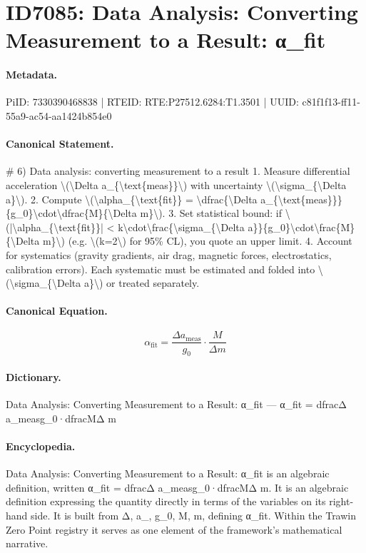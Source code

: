 \section*{ID7085: Data Analysis: Converting Measurement to a Result: α\_fit}
\paragraph{Metadata.}
PiID: 7330390468838 | RTEID: RTE:P27512.6284:T1.3501 | UUID: c81f1f13-ff11-55a9-ac54-aa1424b854e0

\paragraph{Canonical Statement.}
\# 6) Data analysis: converting measurement to a result 1. Measure differential acceleration \textbackslash{}(\textbackslash{}Delta a\_\{\textbackslash{}text\{meas\}\}\textbackslash{}) with uncertainty \textbackslash{}(\textbackslash{}sigma\_\{\textbackslash{}Delta a\}\textbackslash{}). 2. Compute \textbackslash{}(\textbackslash{}alpha\_\{\textbackslash{}text\{fit\}\} = \textbackslash{}dfrac\{\textbackslash{}Delta a\_\{\textbackslash{}text\{meas\}\}\}\{g\_0\}\textbackslash{}cdot\textbackslash{}dfrac\{M\}\{\textbackslash{}Delta m\}\textbackslash{}). 3. Set statistical bound: if \textbackslash{}(|\textbackslash{}alpha\_\{\textbackslash{}text\{fit\}\}| < k\textbackslash{}cdot\textbackslash{}frac\{\textbackslash{}sigma\_\{\textbackslash{}Delta a\}\}\{g\_0\}\textbackslash{}cdot\textbackslash{}frac\{M\}\{\textbackslash{}Delta m\}\textbackslash{}) (e.g. \textbackslash{}(k=2\textbackslash{}) for 95\% CL), you quote an upper limit. 4. Account for systematics (gravity gradients, air drag, magnetic forces, electrostatics, calibration errors). Each systematic must be estimated and folded into \textbackslash{}(\textbackslash{}sigma\_\{\textbackslash{}Delta a\}\textbackslash{}) or treated separately.

\paragraph{Canonical Equation.}
\[
\alpha_{\text{fit}} = \dfrac{\Delta a_{\text{meas}}}{g_0}\cdot\dfrac{M}{\Delta m}
\]

\paragraph{Dictionary.}
Data Analysis: Converting Measurement to a Result: α\_fit — α\_fit = dfracΔ a\_measg\_0·dfracMΔ m

\paragraph{Encyclopedia.}
Data Analysis: Converting Measurement to a Result: α\_fit is an algebraic definition, written α\_fit = dfracΔ a\_measg\_0·dfracMΔ m. It is an algebraic definition expressing the quantity directly in terms of the variables on its right-hand side. It is built from Δ, a\_, g\_0, M, m, defining α\_fit. Within the Trawin Zero Point registry it serves as one element of the framework's mathematical narrative.
